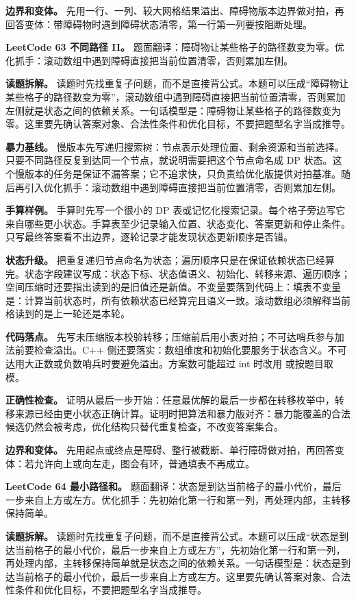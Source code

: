 \textbf{边界和变体。} 先用一行、一列、较大网格结果溢出、障碍物版本边界做对拍，再回答变体：带障碍物时遇到障碍状态清零，第一行第一列要按阻断处理。

\noindent\textbf{LeetCode 63 不同路径 II。} 题面翻译：障碍物让某些格子的路径数变为零。优化抓手：滚动数组中遇到障碍直接把当前位置清零，否则累加左侧。

\textbf{读题拆解。} 读题时先找重复子问题，而不是直接背公式。本题可以压成“障碍物让某些格子的路径数变为零”，滚动数组中遇到障碍直接把当前位置清零，否则累加左侧就是状态之间的依赖关系。一句话模型是：障碍物让某些格子的路径数变为零。这里要先确认答案对象、合法性条件和优化目标，不要把题型名字当成推导。

\textbf{暴力基线。} 慢版本先写递归搜索树：节点表示处理位置、剩余资源和当前选择。只要不同路径反复到达同一个节点，就说明需要把这个节点命名成 DP 状态。这个慢版本的任务是保证不漏答案；它不追求快，只负责给优化版提供对拍基准。随后再引入优化抓手：滚动数组中遇到障碍直接把当前位置清零，否则累加左侧。

\textbf{手算样例。} 手算时先写一个很小的 DP 表或记忆化搜索记录。每个格子旁边写它来自哪些更小状态。手算表至少记录输入位置、状态变化、答案更新和停止条件。只写最终答案看不出边界，逐轮记录才能发现状态更新顺序是否错。

\textbf{状态升级。} 把重复递归节点命名为状态；遍历顺序只是在保证依赖状态已经算完。状态字段建议写成：状态下标、状态值语义、初始化、转移来源、遍历顺序；空间压缩时还要指出读到的是旧值还是新值。不变量要落到代码上：填表不变量是：计算当前状态时，所有依赖状态已经算完且语义一致。滚动数组必须解释当前格读到的是上一轮还是本轮。

\textbf{代码落点。} 先写未压缩版本校验转移；压缩前后用小表对拍；不可达哨兵参与加法前要检查溢出。C++ 侧还要落实：数组维度和初始化要服务于状态含义。不可达用大正数或负数哨兵时要避免溢出。方案数可能超过 int 时改用  或按题目取模。

\textbf{正确性检查。} 证明从最后一步开始：任意最优解的最后一步都在转移枚举中，转移来源已经由更小状态正确计算。证明时把算法和暴力版对齐：暴力能覆盖的合法候选仍然会被考虑，优化结构只替代重复检查，不改变答案集合。

\textbf{边界和变体。} 先用起点或终点是障碍、整行被截断、单行障碍做对拍，再回答变体：若允许向上或向左走，图会有环，普通填表不再成立。

\noindent\textbf{LeetCode 64 最小路径和。} 题面翻译：状态是到达当前格子的最小代价，最后一步来自上方或左方。优化抓手：先初始化第一行和第一列，再处理内部，主转移保持简单。

\textbf{读题拆解。} 读题时先找重复子问题，而不是直接背公式。本题可以压成“状态是到达当前格子的最小代价，最后一步来自上方或左方”，先初始化第一行和第一列，再处理内部，主转移保持简单就是状态之间的依赖关系。一句话模型是：状态是到达当前格子的最小代价，最后一步来自上方或左方。这里要先确认答案对象、合法性条件和优化目标，不要把题型名字当成推导。

